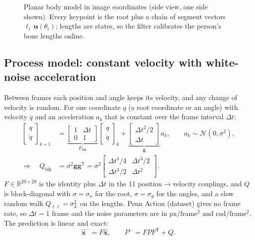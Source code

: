 \documentclass[12pt,a4paper]{article}
\newcommand{\T}{^{\mathsf{T}}}
\begin{document}
\begin{figure}[H]
\begin{tikzpicture}[scale=1.15, >=Stealth, line cap=round,
    seg/.style={line width=2.2pt, blue!70!black}, jnt/.style={circle, fill=white, draw=black, inner sep=1.4pt}]
\end{tikzpicture}
\caption{Planar body model in image coordinates (side view, one side shown). Every keypoint is the root plus
a chain of segment vectors $\ell_i\,\mathbf{u}(\theta_i)$; lengths are states, so the filter calibrates
the person's bone lengths online.}
\label{fig:skeleton}
\end{figure}

\subsection{Process model: constant velocity with white-noise acceleration}

Between frames each position and angle keeps its velocity, and any change of velocity is random. For one
coordinate $q$ (a root coordinate or an angle) with velocity $\dot q$ and an acceleration $a_k$ that is
constant over the frame interval $\Delta t$:
\begin{align}
  \begin{bmatrix} q\\ \dot q\end{bmatrix}_{k+1} &=
  \underbrace{\begin{bmatrix}1 & \Delta t\\ 0 & 1\end{bmatrix}}_{F_{\text{blk}}}
  \begin{bmatrix} q\\ \dot q\end{bmatrix}_k +
  \underbrace{\begin{bmatrix}\Delta t^2/2\\ \Delta t\end{bmatrix}}_{\mathbf{g}} a_k,\qquad
  a_k\sim\mathcal{N}(0,\sigma^2),\\
  \Rightarrow\quad Q_{\text{blk}} &= \sigma^2\mathbf{g}\mathbf{g}\T =
  \sigma^2\begin{bmatrix}\Delta t^4/4 & \Delta t^3/2\\ \Delta t^3/2 & \Delta t^2\end{bmatrix}.
  \label{eq:Q}
\end{align}
$F\in\mathbb{R}^{29\times29}$ is the identity plus $\Delta t$ in the 11 position$\to$velocity couplings,
and $Q$ is block-diagonal with $\sigma=\sigma_a$ for the root, $\sigma=\sigma_{\ddot\theta}$ for the angles,
and a slow random walk $Q_{\ell\ell}=\sigma_L^2$ on the lengths. Penn Action (dataset) gives no frame rate, so
$\Delta t = 1$ frame and the noise parameters are in px/frame$^2$ and rad/frame$^2$.\\ The prediction is
linear and exact:
\begin{equation}
  \hat{\mathbf{x}}^- = F\hat{\mathbf{x}},\qquad P^- = FPF\T + Q.
\end{equation}
\end{document}
